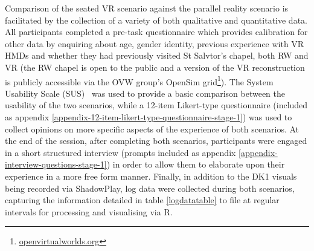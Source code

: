 Comparison of the seated VR scenario against the parallel reality scenario is facilitated by the collection of a variety of both qualitative and quantitative data. All participants completed a pre-task questionnaire which provides calibration for other data by enquiring about age, gender identity, previous experience with VR HMDs and whether they had previously visited St Salvtor's chapel, both RW and VR (the RW chapel is open to the public and a version of the VR reconstruction is publicly accessible via the OVW group's OpenSim grid\footnote{\url{openvirtualworlds.org}}). The System Usability Scale (SUS)~\cite{Brooke1996} was used to provide a basic comparison between the usability of the two scenarios, while a 12-item Likert-type questionnaire (included as appendix \ref{appendix-12-item-likert-type-questionnaire-stage-1}) was used to collect opinions on more specific aspects of the experience of both scenarios. At the end of the session, after completing both scenarios, participants were engaged in a short structured interview (prompts included as appendix \ref{appendix-interview-questions-stage-1}) in order to allow them to elaborate upon their experience in a more free form manner. Finally, in addition to the DK1 visuals being recorded via ShadowPlay, log data were collected during both scenarios, capturing the information detailed in table \ref{logdatatable} to file at regular intervals for processing and visualising via R.

